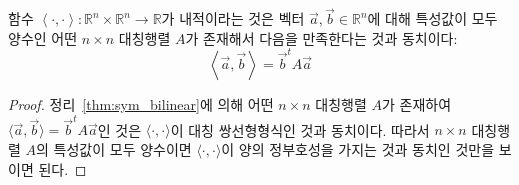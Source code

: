 \documentclass[../engineering_mathematics_lecture_note.tex]{subfiles}
\begin{document}
\begin{theorem}
    함수 $\left<\cdot, \cdot\right>: \mathbb R^n \times \mathbb R^n \rightarrow \mathbb R$가 내적이라는 것은 벡터 $\vec a, \vec b \in \mathbb R^n$에 대해 특성값이 모두 양수인 어떤 $n \times n$ 대칭행렬 $A$가 존재해서 다음을 만족한다는 것과 동치이다:
    \begin{equation*}
        \left<\vec a, \vec b\right> = \vec b^t A \vec a
    \end{equation*}
\end{theorem}

\begin{proof}
    정리~\ref{thm:sym_bilinear}에 의해 어떤 $n \times n$ 대칭행렬 $A$가 존재하여 $\langle \vec a, \vec b \rangle = \vec b^t A \vec a$인 것은 $\langle\cdot, \cdot\rangle$이 대칭 쌍선형형식인 것과 동치이다.
    따라서 $n \times n$ 대칭행렬 $A$의 특성값이 모두 양수이면 $\langle \cdot, \cdot \rangle$이 양의 정부호성을 가지는 것과 동치인 것만을 보이면 된다.


\end{proof}
\end{document}
